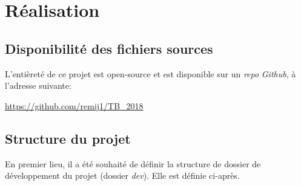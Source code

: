\chapter{Réalisation}\label{realisation}
\section{Disponibilité des fichiers sources}
L'entièreté de ce projet est open-source et est disponible sur un \textit{repo} \textit{Github}, à l'adresse suivante:

\begin{center}
    {\large \url{https://github.com/remij1/TB_2018}}
\end{center}

\section{Structure du projet}
En premier lieu, il a été souhaité de définir la structure de dossier de développement du projet (dossier \textit{dev}). Elle est définie ci-après.

